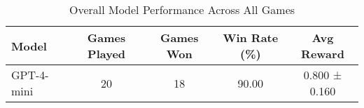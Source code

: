 \begin{table}[htbp]
\centering
\caption{Overall Model Performance Across All Games}
\begin{tabular}{lcccc}
\toprule
Model & Games Played & Games Won & Win Rate (\%) & Avg Reward \\
\midrule
GPT-4-mini & 20 & 18 & 90.00 & 0.800 ± 0.160 \\
\bottomrule
\end{tabular}
\end{table}
